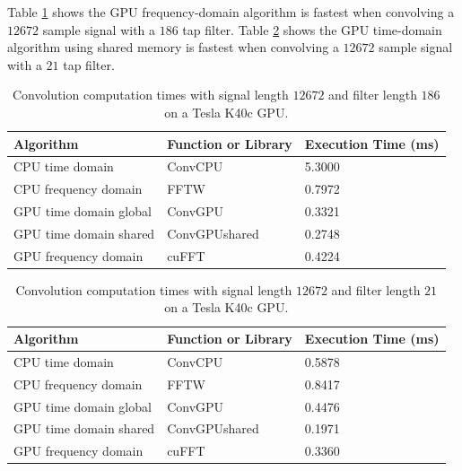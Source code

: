 Table \ref{tab:CPUvsGPUtable_12672_186} shows the GPU frequency-domain algorithm is fastest when convolving a $12672$ sample signal with a $186$ tap filter.
Table \ref{tab:CPUvsGPUtable_12672_21} shows the GPU time-domain algorithm using shared memory is fastest when convolving a $12672$ sample signal with a $21$ tap filter.
\begin{table}
\caption{Convolution computation times with signal length $12672$ and filter length $186$ on a Tesla K40c GPU.}
\begin{center}
\begin{tabular}{lll}
	\toprule
	Algorithm 				& Function or Library		& Execution Time (ms) \\ \midrule
	CPU time domain 		& ConvCPU 					& 5.3000		\\
	CPU frequency domain 	& FFTW 						& 0.7972		\\
	GPU time domain global 	& ConvGPU 					& 0.3321		\\
	GPU time domain shared 	& ConvGPUshared 			& 0.2748		\\
	GPU frequency domain 	& cuFFT						& 0.4224		\\ 
	\bottomrule
\end{tabular}
\end{center}
\label{tab:CPUvsGPUtable_12672_186}
\end{table}
\begin{table}
\caption{Convolution computation times with signal length $12672$ and filter length $21$ on a Tesla K40c GPU.}
\begin{center}
\begin{tabular}{lll}
	\toprule
	Algorithm 				& Function or Library		& Execution Time (ms) \\ \midrule
	CPU time domain 		& ConvCPU 					& 0.5878		\\
	CPU frequency domain 	& FFTW 						& 0.8417		\\
	GPU time domain global 	& ConvGPU 					& 0.4476		\\
	GPU time domain shared 	& ConvGPUshared 			& 0.1971		\\
	GPU frequency domain 	& cuFFT						& 0.3360		\\ 
	\bottomrule
\end{tabular}
\end{center}
\label{tab:CPUvsGPUtable_12672_21}
\end{table}

